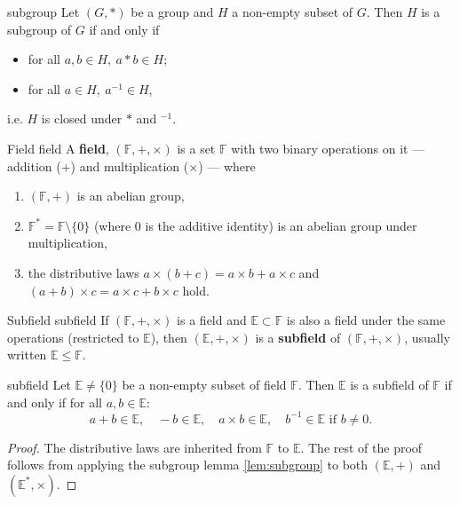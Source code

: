 \begin{lemma}{\cite{math2601_notes}}{subgroup}
Let $(G, *)$ be a group and $H$ a non-empty subset of $G$. Then $H$ is a subgroup of $G$ if and only if
\begin{itemize}
	\item for all $a, b \in H, \ a * b \in H$;
	\item for all $a \in H, \ a^{-1} \in H$,
\end{itemize}
i.e. $H$ is closed under $*$ and $^{-1}$.
\end{lemma}

\begin{definition}{Field \cite{math2601_notes}}{field}
A \textbf{field}, $(\mathbb{F}, +, \times)$ is a set $\mathbb{F}$ with two binary operations on it --- addition ($+$) and multiplication ($\times$) --- where
\begin{enumerate}
	\item $(\mathbb{F}, +)$ is an abelian group,
	\item $\mathbb{F}^{*} = \mathbb{F} \setminus \{0\}$ (where 0 is the additive identity) is an abelian group under multiplication,
	\item the distributive laws $a \times (b + c) = a \times b + a \times c$ and $(a + b) \times c = a \times c + b \times c$ hold.
\end{enumerate}
\end{definition}

\begin{definition}{Subfield \cite{math2601_notes}}{subfield}
If $(\mathbb{F}, +, \times)$ is a field and $\mathbb{E} \subset \mathbb{F}$ is also a field under the same operations (restricted to $\mathbb{E}$), then $(\mathbb{E}, +, \times)$ is a \textbf{subfield} of $(\mathbb{F}, +, \times)$, usually written $\mathbb{E} \leq \mathbb{F}$.
\end{definition}

\begin{lemma}{\cite{math2601_notes}}{subfield}
Let $\mathbb{E} \not = \{0\}$ be a non-empty subset of field $\mathbb{F}$. Then $\mathbb{E}$ is a subfield of $\mathbb{F}$ if and only if for all $a, b \in \mathbb{E}$:
$$ a + b \in \mathbb{E}, \quad -b \in \mathbb{E}, \quad a \times b \in \mathbb{E}, \quad b^{-1} \in \mathbb{E} \text{ if } b \not = 0 . $$

\begin{proof}
The distributive laws are inherited from $\mathbb{F}$ to $\mathbb{E}$. The rest of the proof follows from applying the subgroup lemma \ref{lem:subgroup} to both $(\mathbb{E}, +)$ and $(\mathbb{E}^*, \times)$.
\end{proof}
\end{lemma}

